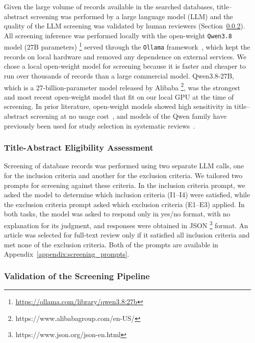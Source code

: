 Given the large volume of records available in the searched databases, title--abstract screening was performed by a large language model (LLM) and the quality of the LLM screening was validated by human reviewers (Section~\ref{sec:validation}). All screening inference was performed locally with the open-weight \texttt{Qwen3.8} model (27B parameters) \footnote{\url{https://ollama.com/library/qwen3.8:27b}} served through the \texttt{Ollama} framework~\cite{marcondes2025using}, which kept the records on local hardware and removed any dependence on external services. We chose a local open-weight model for screening because it is faster and cheaper to run over thousands of records than a large commercial model. Qwen3.8-27B, which is a 27-billion-parameter model released by Alibaba \footnote{https://www.alibabagroup.com/en-US/}, was the strongest and most recent open-weight model that fit on our local GPU at the time of screening. In prior literature, open-weight models showed high sensitivity in title--abstract screening at no usage cost~\cite{sciurti2025compact}, and models of the Qwen family have previously been used for study selection in systematic reviews~\cite{looareesuwan2026study}.

\subsubsection{Title-Abstract Eligibility Assessment}
\label{sec:title-abstract-sceening}

Screening of database records was performed using two separate LLM calls, one for the inclusion criteria and another for the exclusion criteria. We tailored two prompts for screening against these criteria. In the inclusion criteria prompt, we asked the model to determine which inclusion criteria (I1--I4) were satisfied, while the exclusion criteria prompt asked which exclusion criteria (E1--E3) applied. In both tasks, the model was asked to respond only in yes/no format, with no explanation for its judgment, and responses were obtained in JSON \footnote{https://www.json.org/json-en.html} format. An article was selected for full-text review only if it satisfied all inclusion criteria and met none of the exclusion criteria. Both of the prompts are available in Appendix~\ref{appendix:screening_prompts}.



\subsubsection{Validation of the Screening Pipeline}
\label{sec:validation}

